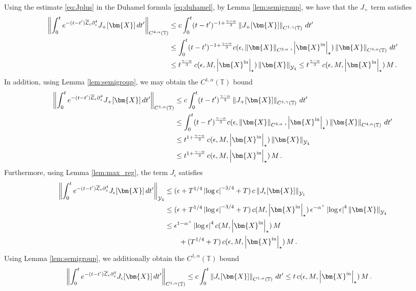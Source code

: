 \documentclass[11pt,reqno]{amsart}
\newcommand{\T}{\mathbb{T}}
\newcommand{\X}{\bm{X}}
\newcommand{\p}{\partial}
\newcommand{\abs}[1]{\left\lvert #1 \right\rvert}
\newcommand{\norm}[1]{\left\lVert #1 \right\rVert}
\newcommand{\mc}[1]{\mathcal{#1}}
\theoremstyle{definition}
\begin{document}
Using the estimate \eqref{eq:Jplus} in the Duhamel formula \eqref{eq:duhamel}, by Lemma \ref{lem:semigroup}, we have that the $J_+$ term satisfies 
\begin{equation}
\begin{aligned}
  \norm{\int_0^t e^{-(t-t')\overline{\mc{L}}_\epsilon\p_s^4}J_+[\X]\,dt'}_{C^{4,\alpha}(\T)}& \le c\int_0^t(t-t')^{-1+\frac{\gamma-\alpha}{3}}\norm{J_+[\X]}_{C^{1,\gamma}(\T)}\,dt'\\
  &\le \int_0^t(t-t')^{-1+\frac{\gamma-\alpha}{3}}c(\epsilon,\norm{\X}_{C^{3,\alpha}},\abs{\X^{\rm in}}_\star)\norm{\X}_{C^{4,\alpha}(\T)}\,dt'\\
  &\le t^{\frac{\gamma-\alpha}{3}}\,c(\epsilon,M,\abs{\X^{\rm in}}_\star)\norm{\X}_{\mc{Y}_4}
  \le t^{\frac{\gamma-\alpha}{3}}\,c(\epsilon,M,\abs{\X^{\rm in}}_\star)\,M\,.
\end{aligned}
\end{equation}
In addition, using Lemma \ref{lem:semigroup}, we may obtain the $C^{1,\alpha}(\T)$ bound
\begin{equation}
\begin{aligned}
  \norm{\int_0^t e^{-(t-t')\overline{\mc{L}}_\epsilon\p_s^4}J_+[\X]\,dt'}_{C^{1,\alpha}(\T)}& \le c\int_0^t(t-t')^{\frac{\gamma-\alpha}{3}}\norm{J_+[\X]}_{C^{1,\gamma}(\T)}\,dt'\\
  &\le \int_0^t(t-t')^{\frac{\gamma-\alpha}{3}}c(\epsilon,\norm{\X}_{C^{3,\alpha}},\abs{\X^{\rm in}}_\star)\norm{\X}_{C^{4,\alpha}(\T)}\,dt'\\
  &\le t^{1+\frac{\gamma-\alpha}{3}}\,c(\epsilon,M,\abs{\X^{\rm in}}_\star)\norm{\X}_{\mc{Y}_4}\\
  &\le t^{1+\frac{\gamma-\alpha}{3}}\,c(\epsilon,M,\abs{\X^{\rm in}}_\star)\,M\,.
\end{aligned}
\end{equation}
%
%
%
Furthermore, using Lemma \ref{lem:max_reg}, the term $J_\epsilon$ satisfies 
\begin{equation}
\begin{aligned}
  \norm{\int_0^t e^{-(t-t')\overline{\mc{L}}_\epsilon\p_s^4}J_\epsilon[\X]\,dt'}_{\mc{Y}_4} &\le (\epsilon + T^{1/4}\abs{\log\epsilon}^{-3/4}+T)\,c\norm{J_\epsilon[\X]}_{\mc{Y}_1}\\
  &\le (\epsilon + T^{1/4}\abs{\log\epsilon}^{-3/4}+T)\,c(M,\abs{\X^{\rm in}}_\star)\,\epsilon^{-\alpha^+}\abs{\log\epsilon}^4\norm{\X}_{\mc{Y}_4}\\
  &\le \epsilon^{1-\alpha^+}\abs{\log\epsilon}^4c(M,\abs{\X^{\rm in}}_\star)\,M\\
  &\qquad 
  + (T^{1/4}+T)\,c(\epsilon,M,\abs{\X^{\rm in}}_\star)\,M\,.
\end{aligned}
\end{equation}
Using Lemma \ref{lem:semigroup}, we additionally obtain the $C^{1,\alpha}(\T)$ bound
\begin{equation}
\begin{aligned}
  \norm{\int_0^t e^{-(t-t')\overline{\mc{L}}_\epsilon\p_s^4}J_\epsilon[\X]\,dt'}_{C^{1,\alpha}(\T)}& \le c\int_0^t\norm{J_\epsilon[\X]}_{C^{1,\alpha}(\T)}\,dt'
  \le t\,c(\epsilon,M,\abs{\X^{\rm in}}_\star)\,M\,.
\end{aligned}
\end{equation}
\end{document}
